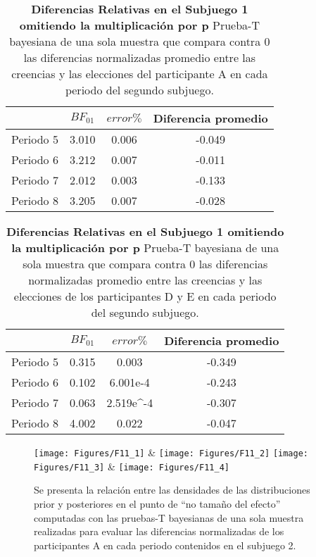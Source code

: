 \begin{table}[h]
\caption[Subjuego 2. Diferencias normalizadas. Participante A.]{\textbf{Diferencias Relativas en el Subjuego 1 omitiendo la multiplicación por p} Prueba-T bayesiana de una sola muestra que compara contra 0 las diferencias normalizadas promedio entre las creencias y las elecciones del participante A en cada periodo del segundo subjuego.}
\label{DN-S2-A-B}
\centering
\begin{tabular}{l | c c | c}
\toprule
\textbf{} & \textbf{$BF_{01}$} & \textbf{$error\%$} & \textbf{Diferencia promedio}\\
\midrule
Periodo 5 & 3.010 & 0.006 & -0.049\\
Periodo 6 & 3.212 & 0.007 & -0.011\\
Periodo 7 & 2.012 & 0.003 & -0.133\\
Periodo 8 & 3.205 & 0.007 & -0.028\\
\bottomrule
\end{tabular}
\end{table}

\begin{table}[h]
\caption[Subjuego 2. Diferencias normalizadas. Participante D y E.]{\textbf{Diferencias Relativas en el Subjuego 1 omitiendo la multiplicación por p} Prueba-T bayesiana de una sola muestra que compara contra 0 las diferencias normalizadas promedio entre las creencias y las elecciones de los participantes D y E en cada periodo del segundo subjuego.}
\label{DN-S2-DyE-B}
\centering
\begin{tabular}{l | c c | c}
\toprule
\textbf{} & \textbf{$BF_{01}$} & \textbf{$error\%$} & \textbf{Diferencia promedio}\\
\midrule
Periodo 5 & 0.315 & 0.003 & -0.349\\
Periodo 6 & 0.102 & 6.001e-4 & -0.243\\
Periodo 7 & 0.063 & 2.519e^-4 & -0.307\\
Periodo 8 & 4.002 & 0.022 & -0.047\\
\bottomrule
\end{tabular}
\end{table}
  

\begin{figure}[hp]
\centering
\texttt{[image: Figures/F11\_1]} & \texttt{[image: Figures/F11\_2]} 
\texttt{[image: Figures/F11\_3]} & \texttt{[image: Figures/F11\_4]} 
\decoRule
\caption[Evaluación de las Diferencias Relativas entre creencias y elecciones en el Subjuego 1 sin la multiplicación por p (Factor de Bayes)]{Se presenta la relación entre las densidades de las distribuciones prior y posteriores en el punto de “no tamaño del efecto” computadas con las pruebas-T bayesianas de una sola muestra realizadas para evaluar las diferencias normalizadas de los participantes A en cada periodo contenidos en el subjuego 2.}
\label{fig:DN_S2_A}
\end{figure}  


